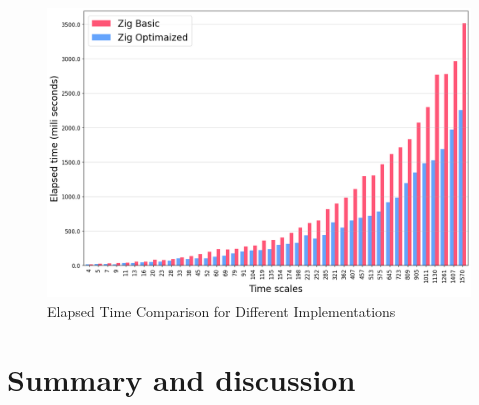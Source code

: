 \documentclass[article]{jss}
\begin{document}
\begin{figure}[h!]
  \centering
  \includegraphics{
    figs/elapsed_tws.png}
  \caption{\label{fig:elapsed_tws}Elapsed Time Comparison for Different Implementations}
\end{figure}

\section{Summary and discussion} \label{sec:summary}







\end{document}
